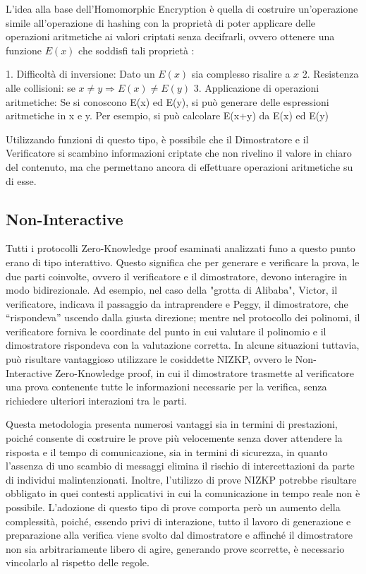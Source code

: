 L'idea alla base dell'Homomorphic Encryption è quella di costruire un'operazione simile all'operazione di hashing con la
proprietà di poter applicare delle operazioni aritmetiche ai valori criptati senza decifrarli, ovvero ottenere una
funzione $E(x)$ che soddisfi tali proprietà :

1. Difficoltà di inversione: Dato un  $E(x)$ sia complesso risalire a  $x$ 2. Resistenza alle collisioni: se $x \ne y
\Rightarrow E(x) \ne E(y)$ 3. Applicazione di operazioni aritmetiche: Se si conoscono E(x) ed E(y), si può generare
delle espressioni aritmetiche in x e y. Per esempio, si può calcolare E(x+y) da E(x) ed E(y)

Utilizzando funzioni di questo tipo, è possibile che il Dimostratore e il Verificatore si scambino informazioni criptate
che non rivelino il valore in chiaro del contenuto, ma che permettano ancora di effettuare operazioni aritmetiche su di
esse.

\subsection{Non-Interactive}

Tutti i protocolli Zero-Knowledge proof esaminati analizzati funo a questo punto erano di tipo interattivo. Questo significa che per
generare e verificare la prova, le due parti coinvolte, ovvero il verificatore e il dimostratore, devono interagire in
modo bidirezionale. Ad esempio, nel caso della "grotta di Alibaba", Victor, il verificatore, indicava il passaggio da
intraprendere e Peggy, il dimostratore, che “rispondeva” uscendo dalla giusta direzione; mentre nel protocollo dei
polinomi, il verificatore forniva le coordinate del punto in cui valutare il polinomio e il dimostratore rispondeva con
la valutazione corretta. In alcune situazioni tuttavia, può risultare vantaggioso utilizzare le cosiddette NIZKP, ovvero
le Non-Interactive Zero-Knowledge proof, in cui il dimostratore trasmette al verificatore una prova contenente tutte le
informazioni necessarie per la verifica, senza richiedere ulteriori interazioni tra le parti. 

Questa metodologia presenta numerosi vantaggi sia in termini di prestazioni, poiché consente di costruire le prove più
velocemente senza dover attendere la risposta e il tempo di comunicazione, sia in termini di sicurezza, in quanto
l'assenza di uno scambio di messaggi elimina il rischio di intercettazioni da parte di individui malintenzionati.
Inoltre, l'utilizzo di prove NIZKP potrebbe risultare obbligato in quei contesti applicativi in cui la comunicazione in
tempo reale non è possibile. L'adozione di questo tipo di prove comporta però un aumento della complessità, poiché,
essendo privi di interazione, tutto il lavoro di generazione e preparazione alla verifica viene svolto dal dimostratore
e affinché il dimostratore non sia arbitrariamente libero di agire, generando prove scorrette, è necessario vincolarlo
al rispetto delle regole. 


